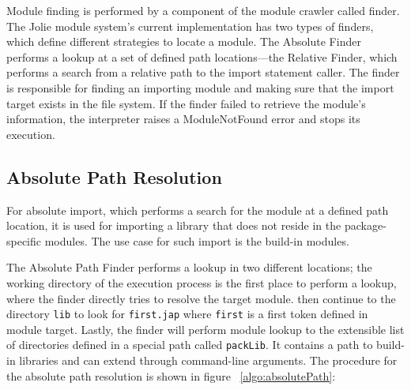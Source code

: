Module finding is performed by a component of the module crawler called finder. The Jolie module system's current implementation has two types of finders, which define different strategies to locate a module. The Absolute Finder performs a lookup at a set of defined path locations—the Relative Finder, which performs a search from a relative path to the import statement caller. The finder is responsible for finding an importing module and making sure that the import target exists in the file system. If the finder failed to retrieve the module's information, the interpreter raises a ModuleNotFound error and stops its execution.

\subsection{ Absolute Path Resolution }

For absolute import, which performs a search for the module at a defined path location, it is used for importing a library that does not reside in the package-specific modules. The use case for such import is the build-in modules.

The Absolute Path Finder performs a lookup in two different locations; the working directory of the execution process is the first place to perform a lookup, where the finder directly tries to resolve the target module. then continue to the directory \texttt{lib} to look for \texttt{first.jap} where \texttt{first} is a first token defined in module target. Lastly, the finder will perform module lookup to the extensible list of directories defined in a special path called \texttt{packLib}. It contains a path to build-in libraries and can extend through command-line arguments. The procedure for the absolute path resolution is shown in figure ~\ref{algo:absolutePath}:

